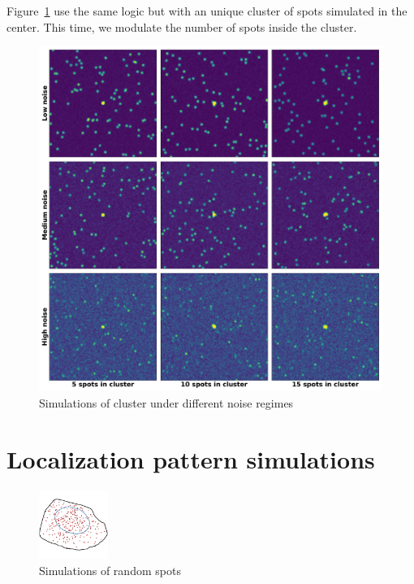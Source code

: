 \null
\vfill

\noindent
Figure~\ref{fig:cluster_mosaic} use the same logic but with an unique cluster of spots simulated in the center.
This time, we modulate the number of spots inside the cluster.

\vfill

\begin{figure}[h]
    \centering
    \includegraphics[width=\textwidth]{figures/appendix/cluster_mosaic}
    \caption{Simulations of cluster under different noise regimes}
    \label{fig:cluster_mosaic}
\end{figure}

\newpage

\section{Localization pattern simulations} \label{sec:appendix_simulations_pattern}

\vfill

\begin{figure}[h]
    \centering
    \includegraphics[width=0.2\textwidth]{figures/appendix/random_1_300}
    \caption{Simulations of random spots}
    \label{fig:random_1_300}
\end{figure}

